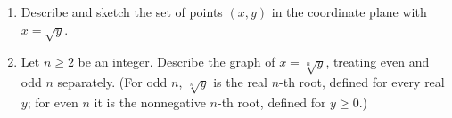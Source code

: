 \begin{enumerate}
\item[(a)] Describe and sketch the set of points $(x,y)$ in the coordinate plane with $x=\sqrt y$.
\item[(b)] Let $n\ge2$ be an integer. Describe the graph of $x=\sqrt[n]{y}$, treating even and odd $n$ separately. (For odd $n$, $\sqrt[n]{y}$ is the real $n$-th root, defined for every real $y$; for even $n$ it is the nonnegative $n$-th root, defined for $y\ge0$.)
\end{enumerate}
